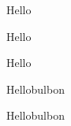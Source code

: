 \lipsum[1]

\begin{tblslineshorizontal}{Hello}
\lipsum[2]
\end{tblslineshorizontal}

\begin{tblsfilled}{Hello}
\lipsum[2]
\end{tblsfilled}

\begin{tblsframed}{Hello}
\lipsum[2]
\end{tblsframed}

\begin{tblsfilledsymbol}{Hello}{bulbon}
\lipsum[24-30]
\end{tblsfilledsymbol}

\begin{tblsframedsymbol}{Hello}{bulbon}
\lipsum[24-30]
\end{tblsframedsymbol}

% 
% 
% 
% 
% 
% 
% 
% 

